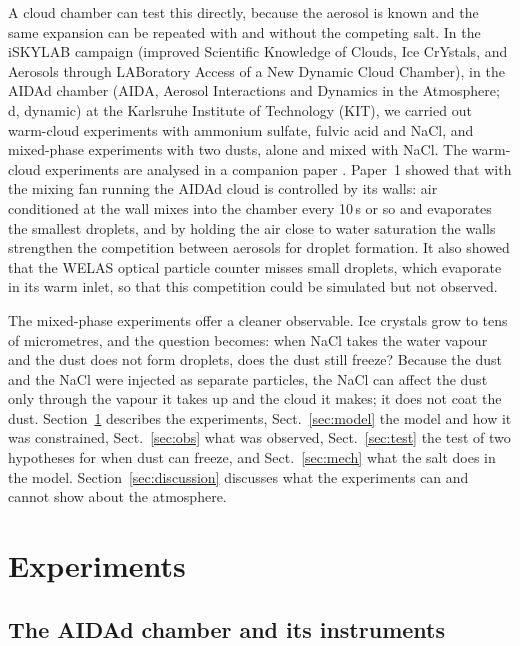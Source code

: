 A cloud chamber can test this directly, because the aerosol is known and the same expansion can be repeated with and without the competing salt. In the iSKYLAB campaign (improved Scientific Knowledge of Clouds, Ice CrYstals, and Aerosols through LABoratory Access of a New Dynamic Cloud Chamber), in the AIDAd chamber (AIDA, Aerosol Interactions and Dynamics in the Atmosphere; d, dynamic) at the Karlsruhe Institute of Technology (KIT), we carried out warm-cloud experiments with ammonium sulfate, fulvic acid and NaCl, and mixed-phase experiments with two dusts, alone and mixed with NaCl. The warm-cloud experiments are analysed in a companion paper \citep[hereafter Paper~1]{Connolly2026}. Paper~1 showed that with the mixing fan running the AIDAd cloud is controlled by its walls: air conditioned at the wall mixes into the chamber every 10\,s or so and evaporates the smallest droplets, and by holding the air close to water saturation the walls strengthen the competition between aerosols for droplet formation. It also showed that the WELAS optical particle counter misses small droplets, which evaporate in its warm inlet, so that this competition could be simulated but not observed.

The mixed-phase experiments offer a cleaner observable. Ice crystals grow to tens of micrometres, and the question becomes: when NaCl takes the water vapour and the dust does not form droplets, does the dust still freeze? Because the dust and the NaCl were injected as separate particles, the NaCl can affect the dust only through the vapour it takes up and the cloud it makes; it does not coat the dust. Section~\ref{sec:experiments} describes the experiments, Sect.~\ref{sec:model} the model and how it was constrained, Sect.~\ref{sec:obs} what was observed, Sect.~\ref{sec:test} the test of two hypotheses for when dust can freeze, and Sect.~\ref{sec:mech} what the salt does in the model. Section~\ref{sec:discussion} discusses what the experiments can and cannot show about the atmosphere.

\section{Experiments}\label{sec:experiments}

\subsection{The AIDAd chamber and its instruments}

